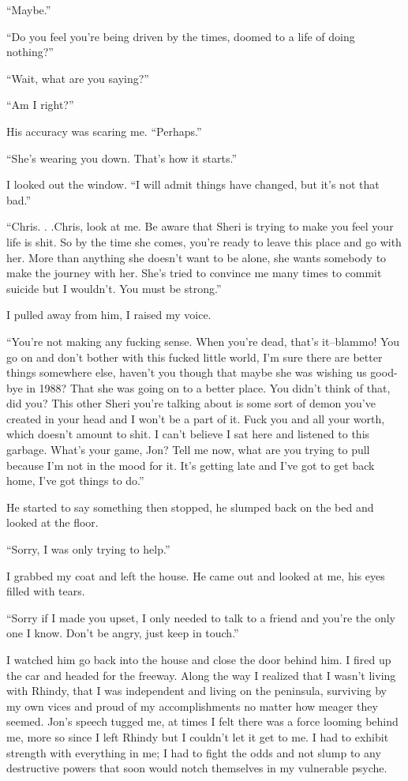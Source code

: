 ``Maybe.''

``Do you feel you're being driven by the times, doomed to a life of
doing nothing?''

``Wait, what are you saying?''

``Am I right?''

His accuracy was scaring me. ``Perhaps.''

``She's wearing you down. That's how it starts.''

I looked out the window. ``I will admit things have changed, but it's
not that bad.''

``Chris. . .Chris, look at me. Be aware that Sheri is trying to make you
feel your life is shit. So by the time she comes, you're ready to leave
this place and go with her. More than anything she doesn't want to be
alone, she wants somebody to make the journey with her. She's tried to
convince me many times to commit suicide but I wouldn't. You must be
strong.''

I pulled away from him, I raised my voice.

``You're not making any fucking sense. When you're dead, that's
it--blammo! You go on and don't bother with this fucked little world,
I'm sure there are better things somewhere else, haven't you though that
maybe she was wishing us good-bye in 1988? That she was going on to a
better place. You didn't think of that, did you? This other Sheri you're
talking about is some sort of demon you've created in your head and I
won't be a part of it. Fuck you and all your worth, which doesn't amount
to shit. I can't believe I sat here and listened to this garbage. What's
your game, Jon? Tell me now, what are you trying to pull because I'm not
in the mood for it. It's getting late and I've got to get back home,
I've got things to do.''

He started to say something then stopped, he slumped back on the bed and
looked at the floor.

``Sorry, I was only trying to help.''

I grabbed my coat and left the house. He came out and looked at me, his
eyes filled with tears.

``Sorry if I made you upset, I only needed to talk to a friend and
you're the only one I know. Don't be angry, just keep in touch.''

I watched him go back into the house and close the door behind him. I
fired up the car and headed for the freeway. Along the way I realized
that I wasn't living with Rhindy, that I was independent and living on
the peninsula, surviving by my own vices and proud of my accomplishments
no matter how meager they seemed. Jon's speech tugged me, at times I
felt there was a force looming behind me, more so since I left Rhindy
but I couldn't let it get to me. I had to exhibit strength with
everything in me; I had to fight the odds and not slump to any
destructive powers that soon would notch themselves in my vulnerable
psyche.

